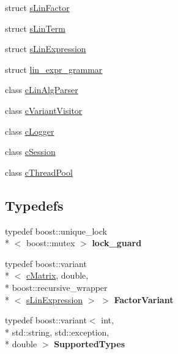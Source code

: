 \begin{DoxyCompactItemize}
struct \hyperlink{structengine_1_1sLinFactor}{s\-Lin\-Factor}
\item 
struct \hyperlink{structengine_1_1sLinTerm}{s\-Lin\-Term}
\item 
struct \hyperlink{structengine_1_1sLinExpression}{s\-Lin\-Expression}
\item 
struct \hyperlink{structengine_1_1lin__expr__grammar}{lin\-\_\-expr\-\_\-grammar}
\item 
class \hyperlink{classengine_1_1cLinAlgParser}{c\-Lin\-Alg\-Parser}
\item 
class \hyperlink{classengine_1_1cVariantVisitor}{c\-Variant\-Visitor}
\item 
class \hyperlink{classengine_1_1cLogger}{c\-Logger}
\item 
class \hyperlink{classengine_1_1cSession}{c\-Session}
\item 
class \hyperlink{classengine_1_1cThreadPool}{c\-Thread\-Pool}
\end{DoxyCompactItemize}
\subsection*{Typedefs}
\begin{DoxyCompactItemize}
\item 
\hypertarget{namespaceengine_af1b349928e8ef52af7a7b83676140e9d}{typedef boost\-::unique\-\_\-lock\\*
$<$ boost\-::mutex $>$ {\bfseries lock\-\_\-guard}}\label{namespaceengine_af1b349928e8ef52af7a7b83676140e9d}

\item 
\hypertarget{namespaceengine_a6596ece313a7134d3129d5385aebd33e}{typedef boost\-::variant\\*
$<$ \hyperlink{structengine_1_1cMatrix}{c\-Matrix}, double, \\*
boost\-::recursive\-\_\-wrapper\\*
$<$ \hyperlink{structengine_1_1sLinExpression}{s\-Lin\-Expression} $>$ $>$ {\bfseries Factor\-Variant}}\label{namespaceengine_a6596ece313a7134d3129d5385aebd33e}

\item 
\hypertarget{namespaceengine_a942a6c5eb4358a465a03cbf32bd4546e}{typedef boost\-::variant$<$ int, \\*
std\-::string, std\-::exception, \\*
double $>$ {\bfseries Supported\-Types}}\label{namespaceengine_a942a6c5eb4358a465a03cbf32bd4546e}

\end{DoxyCompactItemize}

